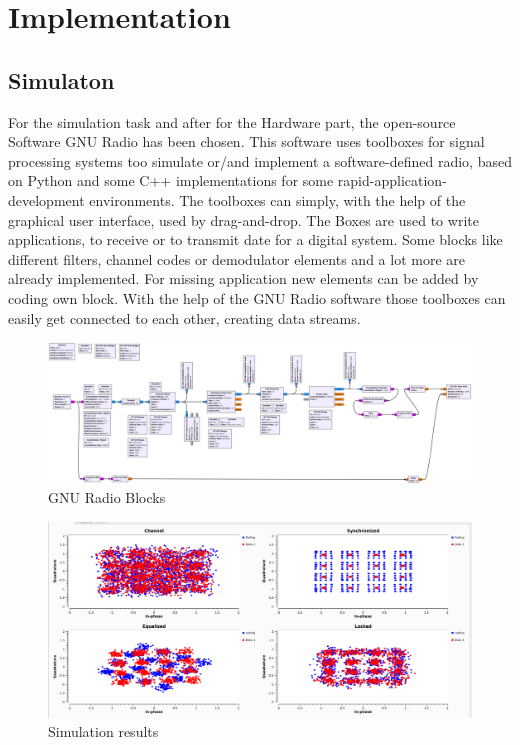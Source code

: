 
\chapter{Implementation}

\section{Simulaton}

For the simulation task and after for the Hardware part, the open-source Software GNU Radio has been chosen. This software uses toolboxes for signal processing systems too simulate or/and implement a software-defined radio, based on Python and some C++ implementations for some rapid-application-development environments. The toolboxes can simply, with the help of the graphical user interface, used by drag-and-drop. The Boxes are used to write applications, to receive or to transmit date for a digital system. Some blocks like different filters, channel codes or demodulator elements and a lot more are already implemented. For missing application new elements can be added by coding own block. With the help of the GNU Radio software those toolboxes can easily get connected to each other, creating data streams. 

\begin{figure}
	\includegraphics[width=\linewidth]{./pdfs/qam_nogui.pdf}
	\caption{GNU Radio Blocks}
	\label{fig:simul16QAM_block}	
\end{figure}


\begin{figure}
	\includegraphics[width=\linewidth]{./figures/screenshots/QAM16_Fading_2.png}
	\caption{Simulation results}
	\label{fig:simul16QAM}	
\end{figure}

